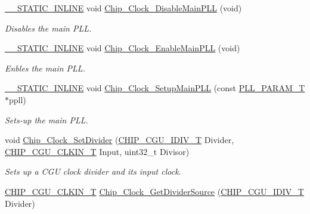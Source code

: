 \begin{DoxyCompactItemize}
\hyperlink{cmsis__iccarm_8h_aba87361bfad2ae52cfe2f40c1a1dbf9c}{\+\_\+\+\_\+\+S\+T\+A\+T\+I\+C\+\_\+\+I\+N\+L\+I\+NE} void \hyperlink{group___c_l_o_c_k__18_x_x__43_x_x_ga752e7a9c291cb61877d9f00a2c9772a3}{Chip\+\_\+\+Clock\+\_\+\+Disable\+Main\+P\+LL} (void)
\begin{DoxyCompactList}\small\item\em Disables the main P\+LL. \end{DoxyCompactList}\item 
\hyperlink{cmsis__iccarm_8h_aba87361bfad2ae52cfe2f40c1a1dbf9c}{\+\_\+\+\_\+\+S\+T\+A\+T\+I\+C\+\_\+\+I\+N\+L\+I\+NE} void \hyperlink{group___c_l_o_c_k__18_x_x__43_x_x_gaf6a067bb264ab963d7f81eaa24ce9ec0}{Chip\+\_\+\+Clock\+\_\+\+Enable\+Main\+P\+LL} (void)
\begin{DoxyCompactList}\small\item\em Enbles the main P\+LL. \end{DoxyCompactList}\item 
\hyperlink{cmsis__iccarm_8h_aba87361bfad2ae52cfe2f40c1a1dbf9c}{\+\_\+\+\_\+\+S\+T\+A\+T\+I\+C\+\_\+\+I\+N\+L\+I\+NE} void \hyperlink{group___c_l_o_c_k__18_x_x__43_x_x_ga227521c8f7cb4a3f3cff4b9b8c5364f0}{Chip\+\_\+\+Clock\+\_\+\+Setup\+Main\+P\+LL} (const \hyperlink{struct_p_l_l___p_a_r_a_m___t}{P\+L\+L\+\_\+\+P\+A\+R\+A\+M\+\_\+T} $\ast$ppll)
\begin{DoxyCompactList}\small\item\em Sets-\/up the main P\+LL. \end{DoxyCompactList}\item 
void \hyperlink{group___c_l_o_c_k__18_x_x__43_x_x_ga9df837b459e11fdf1eda8d48be292fc5}{Chip\+\_\+\+Clock\+\_\+\+Set\+Divider} (\hyperlink{chip__clocks_8h_a588e8716294cc2deec5d583add455521}{C\+H\+I\+P\+\_\+\+C\+G\+U\+\_\+\+I\+D\+I\+V\+\_\+T} Divider, \hyperlink{group___c_l_o_c_k__18_x_x__43_x_x_ga0975326707efebf2b074283e6c602f18}{C\+H\+I\+P\+\_\+\+C\+G\+U\+\_\+\+C\+L\+K\+I\+N\+\_\+T} Input, uint32\+\_\+t Divisor)
\begin{DoxyCompactList}\small\item\em Sets up a C\+GU clock divider and it\textquotesingle{}s input clock. \end{DoxyCompactList}\item 
\hyperlink{group___c_l_o_c_k__18_x_x__43_x_x_ga0975326707efebf2b074283e6c602f18}{C\+H\+I\+P\+\_\+\+C\+G\+U\+\_\+\+C\+L\+K\+I\+N\+\_\+T} \hyperlink{group___c_l_o_c_k__18_x_x__43_x_x_ga3fc4d71a69a9b0c44577264cd9491834}{Chip\+\_\+\+Clock\+\_\+\+Get\+Divider\+Source} (\hyperlink{chip__clocks_8h_a588e8716294cc2deec5d583add455521}{C\+H\+I\+P\+\_\+\+C\+G\+U\+\_\+\+I\+D\+I\+V\+\_\+T} Divider)

\end{DoxyCompactItemize}

